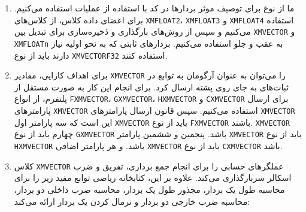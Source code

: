 {\begin{spacing}{1.5}
\begin{enumerate}[label=\textbf{\arabic*}.]
            \item {ما از نوع  برای توصیف موثر بردارها در کد با استفاده از عملیات  استفاده می‌کنیم.
            برای اعضای داده کلاس، از کلاس‌های \texttt{XMFLOAT2}، \texttt{XMFLOAT3} و \texttt{XMFLOAT4} استفاده می‌کنیم و
            سپس از روش‌های بارگذاری و ذخیره‌سازی برای تبدیل بین \texttt{XMVECTOR} و \texttt{XMFLOATn} به عقب و جلو استفاده می‌کنیم.
            بردارهای ثابتی که به نحو اولیه نیاز دارند باید از نوع \texttt{XMVECTORF32} استفاده کنند.}
            \\
            \item {برای اهداف کارایی، مقادیر \texttt{XMVECTOR} را می‌توان به عنوان آرگومان به توابع در ثبات‌های  به جای روی پشته ارسال کرد.
            برای انجام این کار به صورت مستقل از پلتفرم، از انواع \texttt{FXMVECTOR}، \texttt{GXMVECTOR}، \texttt{HXMVECTOR} و \texttt{CXMVECTOR} برای ارسال پارامترهای \texttt{XMVECTOR} استفاده می‌کنیم.
            سپس قانون ارسال پارامترهای \texttt{XMVECTOR} این است که سه پارامتر اول \texttt{XMVECTOR} باید از نوع \texttt{FXMVECTOR} باشند. \texttt{XMVECTOR} چهارم باید از نوع \texttt{GXMVECTOR} باشد.
            پنجمین و ششمین پارامتر \texttt{XMVECTOR} باید از نوع \texttt{HXMVECTOR} باشد. و هر پارامتر اضافی \texttt{XMVECTOR} باید از نوع \texttt{CXMVECTOR} باشد.}
            \\
            \item {کلاس \texttt{XMVECTOR} عملگرهای حسابی را برای انجام جمع برداری، تفریق و ضرب اسکالر سربارگذاری می‌کند.
            علاوه بر این، کتابخانه ریاضی  توابع مفید زیر را برای محاسبه طول یک بردار، مجذور طول یک بردار، محاسبه ضرب داخلی دو بردار، محاسبه ضرب خارجی دو بردار و نرمال کردن یک بردار ارائه می‌کند:
            \textbf{\vspace{6pt}}
            \lr{}
            }
        \end{enumerate}
    \end{spacing}
}
\newpage


